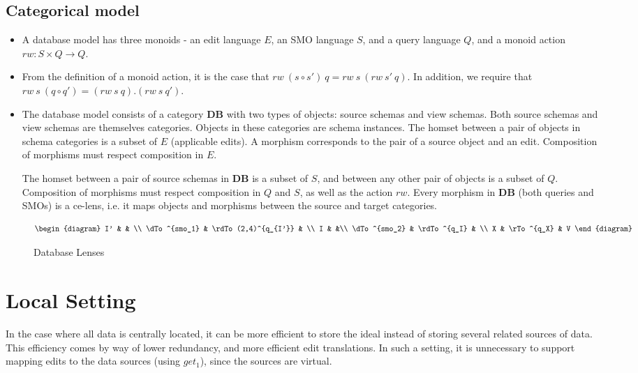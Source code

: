\documentclass[a4paper,10pt]{article}
\newcommand{\db}{\ensuremath{\mathbf{DB}}}
\begin{document}
\subsection{Categorical model}
\begin{itemize}
 \item A database model has three monoids - an edit language $E$, an SMO language $S$, and a query language $Q$, and a monoid action $rw : S \times Q \to Q$.
 
 \item From the definition of a monoid action, it is the case that $rw~(s \circ s')~q = rw~s~(rw~s'~q)$. In addition, we require that $rw~s~(q \circ q') = (rw~s~q). (rw~s~q')$.
 
\item The database model consists of a category $\db$ with two types of objects: source schemas and view schemas. Both source schemas and view schemas are themselves categories. Objects in these categories are schema instances. The homset between a pair of objects in schema categories is a subset of $E$ (applicable edits). A morphism corresponds to the pair of a source object and an edit. Composition of morphisms must respect composition in $E$. 
 
 The homset between a pair of source schemas in $\db$ is a subset of $S$, and between any other pair of objects is a subset of $Q$. Composition of morphisms must respect composition in $Q$ and $S$, as well as the action $rw$. Every morphism in $\db$ (both queries and SMOs) is a ce-lens, i.e. it maps objects and morphisms between the source and target categories.
 
\end{itemize}

\begin{figure}[ht]
\begin{displaymath}
\begin{diagram}
I' & & \\
\dTo^{smo_1} & \rdTo(2,4)^{q_{I'}} & \\
I & &\\
\dTo^{smo_2} & \rdTo^{q_I} & \\
X & \rTo^{q_X} & V
\end{diagram}
\end{displaymath}
\caption{Database Lenses}
\label{fig:database-lens}
\end{figure}


\section{Local Setting}
  In the case where all data is centrally located, it can be more efficient to store the ideal instead of storing several related sources of data. This efficiency comes by way of lower redundancy, and more efficient edit translations. In such a setting, it is unnecessary to support mapping edits to the data sources (using $get_1$), since the sources are virtual. 
\end{document}
